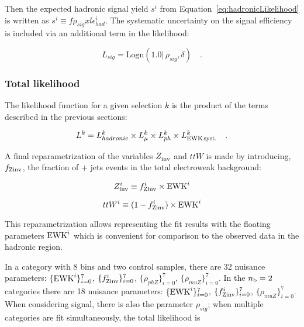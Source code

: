Then the expected hadronic signal yield $s^i$ from
Equation~\ref{eq:hadronicLikelihood} is written as $s^i \equiv
f\rho_{sig} xl\epsilon_{had}^i$. The systematic uncertainty on
the signal efficiency is included via an additional term in the
likelihood:

\begin{equation}
L_{sig}=\mathrm{Logn}(1.0 |\,\rho_{sig}, \delta) \quad .
\end{equation}

\subsubsection{Total likelihood}
\label{sec:totalLikelihood}

The likelihood function for a given selection $k$ is the product of
the terms described in the previous sections:

\begin{equation}
L^k = L_{hadronic}^k \times L_{\mu}^k \times L_{ph}^k \times
L_{\rm EWK\, syst.}^k \quad .
\end{equation}

A final reparametrization of the variables $Z_{\rm inv}^{}$ and $ttW$ is made
by introducing, $f_{\rm Zinv}$, the fraction of \znunu + jets events in the total
electroweak background:

\begin{equation}
  Z_{\rm inv}^{i} \equiv f_{\rm Zinv}^{i} \times \mathrm{EWK}^i 
  \label{eq:ZinvEwk}
\end{equation}

\begin{equation}
  ttW^{i} \equiv (1-f_{\rm Zinv}^{i})\times \mathrm{EWK}^i
  \label{eq:ttWEwk}
\end{equation}


This reparametrization allows representing the fit results with the floating
parameters $\mathrm{EWK}^{i}$ which is convenient for comparison to the observed data
in the hadronic region. 

In a category with 8 \HT bins and two control samples, there are 
32 nuisance parameters: $\{\mathrm{EWK}^{i}\}_{i=0}^{7}$, $\{f_{\rm Zinv}^{i}\}_{i=0}^{7}$, $\{\rho_{phZ}\}_{i=0}^{7}$,
$\{\rho_{muZ}\}_{i=0}^{7}$. In the $n_{\text{b}} = 2$ categories there are 
18 nuisance parameters: $\{\mathrm{EWK}^{i}\}_{i=0}^{7}$, $\{f_{\rm Zinv}^{i}\}_{i=0}^{7}$, 
$\{\rho_{muZ}\}_{i=0}^{7}$.  When considering signal, 
there is also the parameter $\rho_{sig}$; when multiple categories 
are fit simultaneously, the total likelihood is

